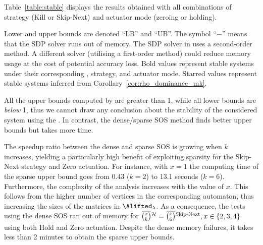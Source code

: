 Table~\ref{table:stable} displays the results obtained with all combinations of strategy (Kill or Skip-Next) and actuator mode (zeroing or holding).

Lower and upper bounds are denoted ``LB'' and ``UB''. 
The symbol ``$-$'' means that the SDP solver runs out of memory.
The SDP solver in  uses a second-order method.
A different solver (utilising a first-order method) could reduce memory usage at the cost of potential accuracy loss.
Bold values represent stable systems under their corresponding \ewhc{}, strategy, and actuator mode.
Starred values represent stable systems inferred from Corollary~\ref{cor:rho_dominance_mk}.

All the upper bounds computed by  are greater than 1, while all lower bounds are \emph{below} 1, thus we cannot draw any conclusion about the stability of the considered system using the .
In contrast, the dense/sparse SOS method finds better upper bounds but takes more time.

The speedup ratio between the dense and sparse SOS is growing when $k$ increases, yielding a particularly high benefit of exploiting sparsity for the Skip-Next strategy and Zero actuation.
For instance, with $x=1$ the computing time of the sparse upper bound goes from 0.43 ($k=2$) to 13.1 seconds ($k=6$).
%
Furthermore, the complexity of the analysis increases with the value of $x$.
This follows from the higher number of vertices in the corresponding automaton, thus increasing the sizes of the matrices in $\Alifted_{\lambda}$. 
%
As a consequence, the tests using the dense SOS ran out of memory for $\eanymiss{}{\strat} = \overbar{\binom{x}{6}}^{\text{Skip-Next}}, x \in \left\{ 2, 3, 4 \right\}$ using both Hold and Zero actuation.
Despite the dense memory failures, it takes less than 2 minutes to obtain the sparse upper bounds.



